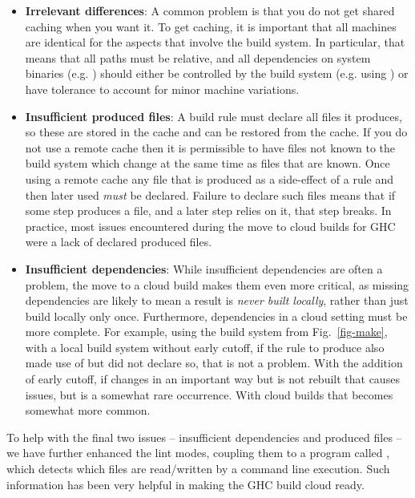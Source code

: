 \begin{itemize}
\item \textbf{Irrelevant differences}: A common problem is that you do not get
      shared caching when you want it. To get caching, it is important that all
      machines are identical for the aspects that involve the build system. In
      particular, that means that all paths must be relative, and all
      dependencies on system binaries (e.g. ) should either be
      controlled by the build system (e.g. using \Nix) or have tolerance to
      account for minor machine variations.
\item \textbf{Insufficient produced files}: A build rule must declare all files
      it produces, so these are stored in the cache and can be restored from the
      cache. If you do not use a remote cache then it is permissible to have
      files not known to the build system which change at the same time as files
      that are known. Once using a remote cache any file that is produced as a
      side-effect of a rule and then later used \emph{must} be declared. Failure
      to declare such files means that if some step produces a file, and a later
      step relies on it, that step breaks. In practice, most issues encountered
      during the move to cloud builds for GHC were a lack of declared produced
      files.
\item \textbf{Insufficient dependencies}: While insufficient dependencies are
      often a problem, the move to a cloud build makes them even more critical,
      as missing dependencies are likely to mean a result is \emph{never built
      locally}, rather than just build locally only once. Furthermore,
      dependencies in a cloud setting must be more complete. For example, using
      the build system from Fig.~\ref{fig-make}, with a local build system
      without early cutoff, if the rule to produce  also made use
      of  but did not declare so, that is not a problem. With the
      addition of early cutoff, if  changes in an important way but
       is not rebuilt that causes issues, but is a somewhat rare
      occurrence. With cloud builds that becomes somewhat more common.
\end{itemize}

To help with the final two issues -- insufficient dependencies and produced
files -- we have further enhanced the \Shake lint modes, coupling them to a
program called , which detects which files are read/written by a
command line execution. Such information has been very helpful in making the GHC
build cloud ready.
